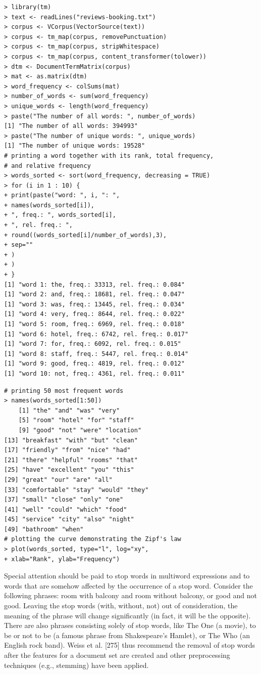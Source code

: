 \documentclass[10pt]{book}
\begin{document}
\begin{verbatim}
> library(tm)
> text <- readLines("reviews-booking.txt")
> corpus <- VCorpus(VectorSource(text))
> corpus <- tm_map(corpus, removePunctuation)
> corpus <- tm_map(corpus, stripWhitespace)
> corpus <- tm_map(corpus, content_transformer(tolower))
> dtm <- DocumentTermMatrix(corpus)
> mat <- as.matrix(dtm)
> word_frequency <- colSums(mat)
> number_of_words <- sum(word_frequency)
> unique_words <- length(word_frequency)
> paste("The number of all words: ", number_of_words)
[1] "The number of all words: 394993"
> paste("The number of unique words: ", unique_words)
[1] "The number of unique words: 19528"
# printing a word together with its rank, total frequency,
# and relative frequency
> words_sorted <- sort(word_frequency, decreasing = TRUE)
> for (i in 1 : 10) {
+ print(paste("word: ", i, ": ",
+ names(words_sorted[i]),
+ ", freq.: ", words_sorted[i],
+ ", rel. freq.: ",
+ round((words_sorted[i]/number_of_words),3),
+ sep=""
+ )
+ )
+ }
[1] "word 1: the, freq.: 33313, rel. freq.: 0.084"
[1] "word 2: and, freq.: 18681, rel. freq.: 0.047"
[1] "word 3: was, freq.: 13445, rel. freq.: 0.034"
[1] "word 4: very, freq.: 8644, rel. freq.: 0.022"
[1] "word 5: room, freq.: 6969, rel. freq.: 0.018"
[1] "word 6: hotel, freq.: 6742, rel. freq.: 0.017"
[1] "word 7: for, freq.: 6092, rel. freq.: 0.015"
[1] "word 8: staff, freq.: 5447, rel. freq.: 0.014"
[1] "word 9: good, freq.: 4819, rel. freq.: 0.012"
[1] "word 10: not, freq.: 4361, rel. freq.: 0.011"
\end{verbatim}

\begin{verbatim}
# printing 50 most frequent words
> names(words_sorted[1:50])
    [1] "the" "and" "was" "very"
    [5] "room" "hotel" "for" "staff"
    [9] "good" "not" "were" "location"
[13] "breakfast" "with" "but" "clean"
[17] "friendly" "from" "nice" "had"
[21] "there" "helpful" "rooms" "that"
[25] "have" "excellent" "you" "this"
[29] "great" "our" "are" "all"
[33] "comfortable" "stay" "would" "they"
[37] "small" "close" "only" "one"
[41] "well" "could" "which" "food"
[45] "service" "city" "also" "night"
[49] "bathroom" "when"
# plotting the curve demonstrating the Zipf's law
> plot(words_sorted, type="l", log="xy",
+ xlab="Rank", ylab="Frequency")
\end{verbatim}

Special attention should be paid to stop words in multiword expressions and to words that are somehow affected by the occurrence of a stop word. Consider the following phrases: room with balcony and room without balcony, or good and not good. Leaving the stop words (with, without, not) out of consideration, the meaning of the phrase will change significantly (in fact, it will be the opposite). There are also phrases consisting solely of stop words, like The One (a movie), to be or not to be (a famous phrase from Shakespeare's Hamlet), or The Who (an English rock band). Weiss et al. [275] thus recommend the removal of stop words after the features for a document set are created and other preprocessing techniques (e.g., stemming) have been applied.
\end{document}
